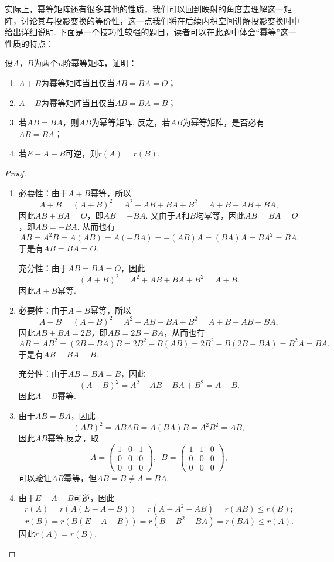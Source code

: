 实际上，幂等矩阵还有很多其他的性质，我们可以回到映射的角度去理解这一矩阵，讨论其与投影变换的等价性，这一点我们将在后续内积空间讲解投影变换时中给出详细说明. 下面是一个技巧性较强的题目，读者可以在此题中体会``幂等''这一性质的特点：
\begin{example}
    设$A$，$B$为两个$n$阶幂等矩阵，证明：
    \begin{enumerate}
        \item $A+B$为幂等矩阵当且仅当$AB=BA=O$；

        \item $A-B$为幂等矩阵当且仅当$AB=BA=B$；

        \item 若$AB=BA$，则$AB$为幂等矩阵. 反之，若$AB$为幂等矩阵，是否必有$AB=BA$；

        \item 若$E-A-B$可逆，则$r(A)=r(B)$.
    \end{enumerate}
\end{example}

\begin{proof}
    \begin{enumerate}
        \item 必要性：由于$A+B$幂等，所以
        \[A+B=(A+B)^2=A^2+AB+BA+B^2=A+B+AB+BA,\]
        因此$AB+BA=O$，即$AB=-BA$. 又由于$A$和$B$均幂等，因此$AB=BA=O$，即$AB=-BA$. 从而也有
        \[AB=A^2B=A(AB)=A(-BA)=-(AB)A=(BA)A=BA^2=BA.\]
        于是有$AB=BA=O$.

        充分性：由于$AB=BA=O$，因此
        \[(A+B)^2=A^2+AB+BA+B^2=A+B.\]
        因此$A+B$幂等.

        \item 必要性：由于$A-B$幂等，所以
        \[A-B=(A-B)^2=A^2-AB-BA+B^2=A+B-AB-BA,\]
        因此$AB+BA=2B$，即$AB=2B-BA$，从而也有
        \[AB=AB^2=(2B-BA)B=2B^2-B(AB)=2B^2-B(2B-BA)=B^2A=BA.\]
        于是有$AB=BA=B$.

        充分性：由于$AB=BA=B$，因此
        \[(A-B)^2=A^2-AB-BA+B^2=A-B.\]
        因此$A-B$幂等.

        \item 由于$AB=BA$，因此
        \[(AB)^2=ABAB=A(BA)B=A^2B^2=AB,\]
        因此$AB$幂等.反之，取
        \[A=\begin{pmatrix}
            1 & 0 & 1 \\ 0 & 0 & 0 \\ 0 & 0 & 0
        \end{pmatrix},\enspace B=\begin{pmatrix}
            1 & 1 & 0 \\ 0 & 0 & 0 \\ 0 & 0 & 0
        \end{pmatrix},\]
        可以验证$AB$幂等，但$AB=B\neq A=BA$.

        \item 由于$E-A-B$可逆，因此
        \[r(A)=r(A(E-A-B))=r(A-A^2-AB)=r(AB)\leqslant r(B);\]
        \[r(B)=r(B(E-A-B))=r(B-B^2-BA)=r(BA)\leqslant r(A).\]
        因此$r(A)=r(B)$.
    \end{enumerate}
\end{proof}


